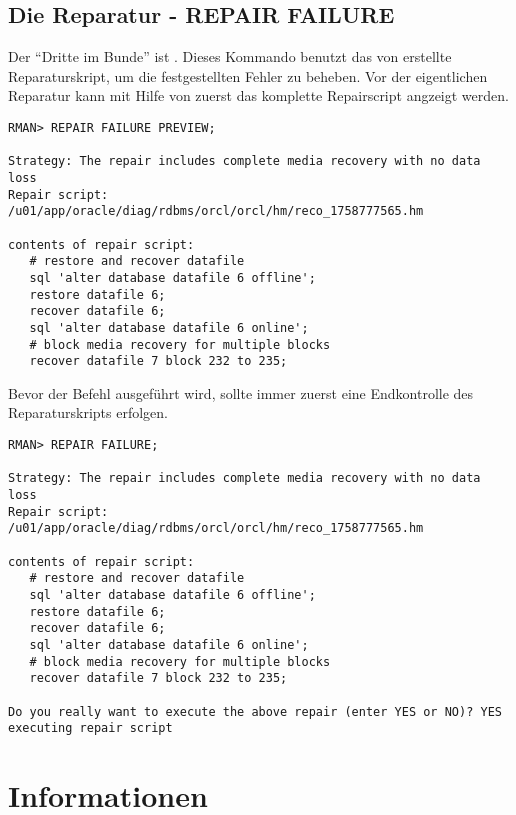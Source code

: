       \subsection{Die Reparatur - REPAIR FAILURE}
        Der \enquote{Dritte im Bunde} ist . Dieses
        Kommando benutzt das von  erstellte
        Reparaturskript, um die festgestellten Fehler zu beheben. Vor der
        eigentlichen Reparatur kann mit Hilfe von  zuerst das komplette Repairscript angzeigt werden.
\clearpage
        \begin{lstlisting}[caption={Eine Vorschau auf das Repairscript},label=admin1542,language=rman]
RMAN> REPAIR FAILURE PREVIEW;

Strategy: The repair includes complete media recovery with no data loss
Repair script: /u01/app/oracle/diag/rdbms/orcl/orcl/hm/reco_1758777565.hm

contents of repair script:
   # restore and recover datafile
   sql 'alter database datafile 6 offline';
   restore datafile 6;
   recover datafile 6;
   sql 'alter database datafile 6 online';
   # block media recovery for multiple blocks
   recover datafile 7 block 232 to 235;
        \end{lstlisting}
        Bevor der Befehl  ausgef\"uhrt wird, sollte immer zuerst eine Endkontrolle des Reparaturskripts erfolgen.
        \begin{lstlisting}[caption={Die Fehler reparieren},label=admin1543,language=rman]
RMAN> REPAIR FAILURE;

Strategy: The repair includes complete media recovery with no data loss
Repair script: /u01/app/oracle/diag/rdbms/orcl/orcl/hm/reco_1758777565.hm

contents of repair script:
   # restore and recover datafile
   sql 'alter database datafile 6 offline';
   restore datafile 6;
   recover datafile 6;
   sql 'alter database datafile 6 online';
   # block media recovery for multiple blocks
   recover datafile 7 block 232 to 235;

Do you really want to execute the above repair (enter YES or NO)? YES
executing repair script
        \end{lstlisting}
\clearpage
    \section{Informationen}
